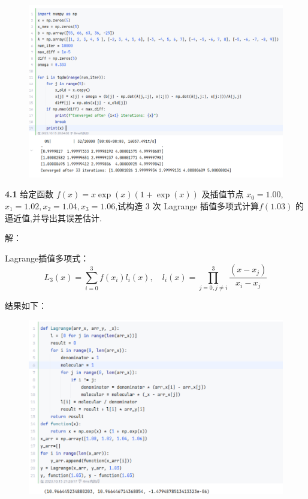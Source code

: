 \documentclass[a4paper,11pt,UTF8]{article}
\begin{document}
\begin{figure}[H]
	\centering
	\includegraphics[scale=0.3]{3.10_4}
\end{figure}
\textbf{4.1} 给定函数 $f(x)=x\exp(x)(1+\exp(x))$ 及插值节点 $x_0=1.00,$ $x_{1}=1.02,x_{2}=1.04,x_{3}=1.06$,试构造 3 次 Lagrange 插值多项式计算$f(1.03)$ 的逼近值,并导出其误差估计.

解：

Lagrange插值多项式：
$$
	L_3(x)=\sum_{i=0}^3f(x_i)l_i(x),\quad l_i(x)=\prod_{j=0,j\neq i}^{3}\frac{(x-x_j)}{x_i-x_j}
$$

结果如下：
\begin{figure}[H]
	\centering
	\includegraphics[scale=0.37]{4.1}
\end{figure}
\end{document}

